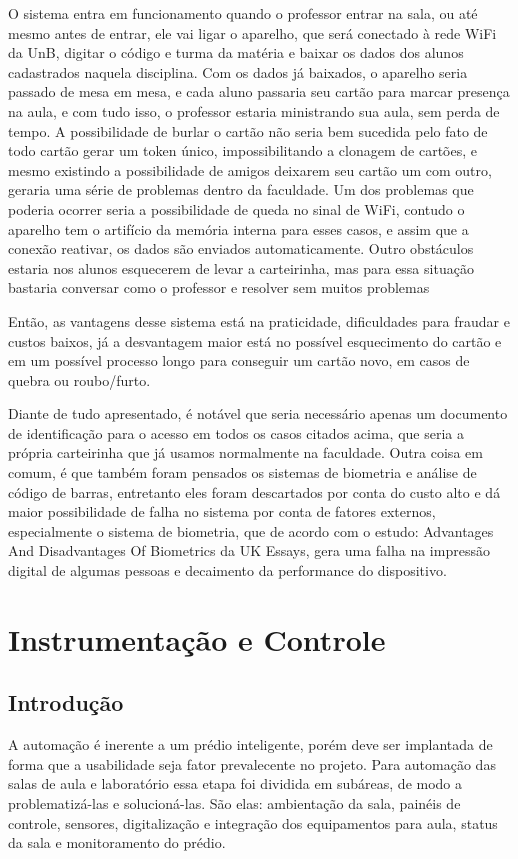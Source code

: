 O sistema entra em funcionamento quando o professor entrar na sala, ou até mesmo antes de entrar, ele vai ligar o aparelho, que será conectado à rede WiFi da UnB, digitar o código e turma da matéria e baixar os dados dos alunos cadastrados naquela disciplina. Com os dados já baixados, o aparelho seria passado de mesa em mesa, e cada aluno passaria seu cartão para marcar presença na aula, e com tudo isso, o professor estaria ministrando sua aula, sem perda de tempo. A possibilidade de burlar o cartão não seria bem sucedida pelo fato de todo cartão gerar um token único, impossibilitando a clonagem de cartões, e mesmo existindo a possibilidade de amigos deixarem seu cartão um com outro, geraria uma série de problemas dentro da faculdade. Um dos problemas que poderia ocorrer seria a possibilidade de queda no sinal de WiFi, contudo o aparelho tem o artifício da memória interna para esses casos, e assim que a conexão reativar, os dados são enviados automaticamente. Outro obstáculos estaria nos alunos esquecerem de levar a carteirinha, mas para essa situação bastaria conversar como o professor e resolver sem muitos problemas

Então, as vantagens desse sistema está na praticidade, dificuldades para fraudar e custos baixos, já a desvantagem maior está no possível esquecimento do cartão e em um possível processo longo para conseguir um cartão novo, em casos de quebra ou roubo/furto.

Diante de tudo apresentado, é notável que seria necessário apenas um documento de identificação para o acesso em todos os casos citados acima, que seria a própria carteirinha que já usamos normalmente na faculdade. Outra coisa em comum, é que também foram pensados os sistemas de biometria e análise de código de barras, entretanto eles foram descartados por conta do custo alto e dá maior possibilidade de falha no sistema por conta de fatores externos, especialmente o sistema de biometria, que de acordo com o estudo: Advantages And Disadvantages Of Biometrics da UK Essays, gera uma falha na impressão digital de algumas pessoas e decaimento da performance do dispositivo.



\chapter[Instrumentação e Controle]{Instrumentação e Controle}
\section{Introdução}
A automação é inerente a um prédio inteligente, porém deve ser implantada de forma que a usabilidade seja fator prevalecente no projeto. Para automação das salas de aula e laboratório essa etapa foi dividida em subáreas, de modo a problematizá-las e solucioná-las. São elas: ambientação da sala, painéis de controle, sensores, digitalização  e integração dos equipamentos para aula, status da sala e monitoramento do prédio.

